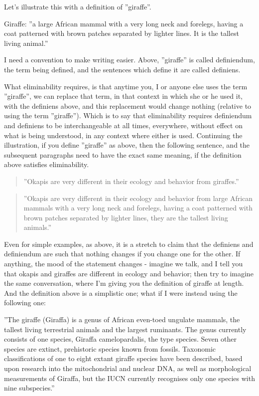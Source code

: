 Let's illustrate this with a definition of ''giraffe''. 

\begin{svgraybox}
Giraffe: ''a large African mammal with a very long neck and forelegs, having a coat patterned with brown patches separated by lighter lines. It is the tallest living animal.'' \cite{def-giraffe}
\end{svgraybox}

I need a convention to make writing easier. Above, ''giraffe'' is called definiendum, the term being defined, and the sentences which define it are called definiens.

What eliminability requires, is that anytime you, I or anyone else uses the term ''giraffe'', we can replace that term, in that context in which she or he used it, with the definiens above, and this replacement would change nothing (relative to using the term ''giraffe''). Which is to say that eliminability requires definiendum and definiens to be interchangeable at all times, everywhere, without effect on what is being understood, in any context where either is used. Continuing the illustration, if you define ''giraffe'' as above, then the following sentence, and the subsequent paragraphs need to have the exact same meaning, if the definition above satisfies eliminability.

\begin{quote}
''Okapis are very different in their ecology and behavior from giraffes.''
\end{quote}

\begin{quote}
''Okapis are very different in their ecology and behavior from large African mammals with a very long neck and forelegs, having a coat patterned with brown patches separated by lighter lines, they are the tallest living animals.''
\end{quote}

Even for simple examples, as above, it is a stretch to claim that the definiens and definiendum are such that nothing changes if you change one for the other. If anything, the mood of the statement changes - imagine we talk, and I tell you that okapis and giraffes are different in ecology and behavior; then try to imagine the same conversation, where I'm giving you the definition of giraffe at length. And the definition above is a simplistic one; what if I were instead using the following one:

\begin{svgraybox}
''The giraffe (Giraffa) is a genus of African even-toed ungulate mammals, the tallest living terrestrial animals and the largest ruminants. The genus currently consists of one species, Giraffa camelopardalis, the type species. Seven other species are extinct, prehistoric species known from fossils. Taxonomic classifications of one to eight extant giraffe species have been described, based upon research into the mitochondrial and nuclear DNA, as well as morphological measurements of Giraffa, but the IUCN currently recognises only one species with nine subspecies.'' \cite{wikipedia-giraffe}
\end{svgraybox}

